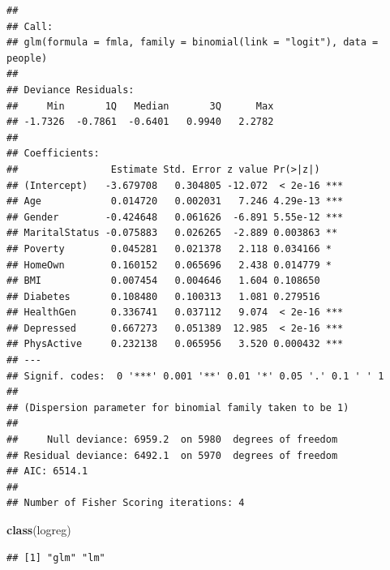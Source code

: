 \documentclass[]{article}
\newenvironment{Shaded}{\begin{snugshade}}{\end{snugshade}}
\newcommand{\KeywordTok}[1]{\textcolor[rgb]{0.13,0.29,0.53}{\textbf{{#1}}}}
\newcommand{\DataTypeTok}[1]{\textcolor[rgb]{0.13,0.29,0.53}{{#1}}}
\newcommand{\StringTok}[1]{\textcolor[rgb]{0.31,0.60,0.02}{{#1}}}
\newcommand{\CommentTok}[1]{\textcolor[rgb]{0.56,0.35,0.01}{\textit{{#1}}}}
\newcommand{\NormalTok}[1]{{#1}}
\begin{document}
\begin{verbatim}
## 
## Call:
## glm(formula = fmla, family = binomial(link = "logit"), data = people)
## 
## Deviance Residuals: 
##     Min       1Q   Median       3Q      Max  
## -1.7326  -0.7861  -0.6401   0.9940   2.2782  
## 
## Coefficients:
##                Estimate Std. Error z value Pr(>|z|)    
## (Intercept)   -3.679708   0.304805 -12.072  < 2e-16 ***
## Age            0.014720   0.002031   7.246 4.29e-13 ***
## Gender        -0.424648   0.061626  -6.891 5.55e-12 ***
## MaritalStatus -0.075883   0.026265  -2.889 0.003863 ** 
## Poverty        0.045281   0.021378   2.118 0.034166 *  
## HomeOwn        0.160152   0.065696   2.438 0.014779 *  
## BMI            0.007454   0.004646   1.604 0.108650    
## Diabetes       0.108480   0.100313   1.081 0.279516    
## HealthGen      0.336741   0.037112   9.074  < 2e-16 ***
## Depressed      0.667273   0.051389  12.985  < 2e-16 ***
## PhysActive     0.232138   0.065956   3.520 0.000432 ***
## ---
## Signif. codes:  0 '***' 0.001 '**' 0.01 '*' 0.05 '.' 0.1 ' ' 1
## 
## (Dispersion parameter for binomial family taken to be 1)
## 
##     Null deviance: 6959.2  on 5980  degrees of freedom
## Residual deviance: 6492.1  on 5970  degrees of freedom
## AIC: 6514.1
## 
## Number of Fisher Scoring iterations: 4
\end{verbatim}

\begin{Shaded}
\begin{Highlighting}[]
\KeywordTok{class}\NormalTok{(logreg)}
\end{Highlighting}
\end{Shaded}

\begin{verbatim}
## [1] "glm" "lm"
\end{verbatim}

\begin{Shaded}
\end{Shaded}
\end{document}
